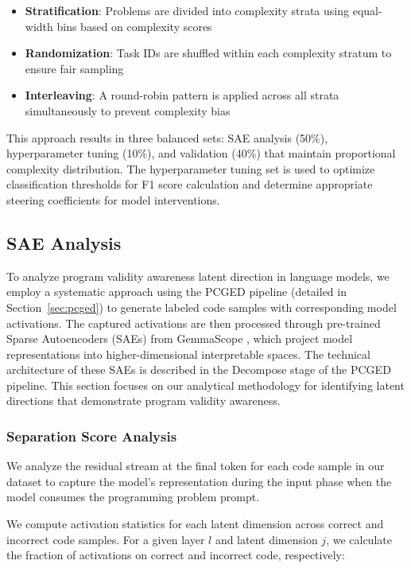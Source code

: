 \documentclass[11pt]{article}
\begin{document}
\begin{itemize}
    \item \textbf{Stratification}: Problems are divided into complexity strata using equal-width bins based on complexity scores
    \item \textbf{Randomization}: Task IDs are shuffled within each complexity stratum to ensure fair sampling
    \item \textbf{Interleaving}: A round-robin pattern is applied across all strata simultaneously to prevent complexity bias
\end{itemize}

This approach results in three balanced sets: SAE analysis (50\%), hyperparameter tuning (10\%), and validation (40\%) that maintain proportional complexity distribution. The hyperparameter tuning set is used to optimize classification thresholds for F1 score calculation and determine appropriate steering coefficients for model interventions. 

\subsection{SAE Analysis}

To analyze program validity awareness latent direction in language models, we employ a systematic approach using the PCGED pipeline (detailed in Section~\ref{sec:pcged}) to generate labeled code samples with corresponding model activations. The captured activations are then processed through pre-trained Sparse Autoencoders (SAEs) from GemmaScope \citep{lieberum2024gemma}, which project model representations into higher-dimensional interpretable spaces. The technical architecture of these SAEs is described in the Decompose stage of the PCGED pipeline. This section focuses on our analytical methodology for identifying latent directions that demonstrate program validity awareness.

\subsubsection{Separation Score Analysis}

We analyze the residual stream at the final token for each code sample in our dataset to capture the model's representation during the input phase when the model consumes the programming problem prompt. 

We compute activation statistics for each latent dimension across correct and incorrect code samples. For a given layer $l$ and latent dimension $j$, we calculate the fraction of activations on correct and incorrect code, respectively:
\end{document}
